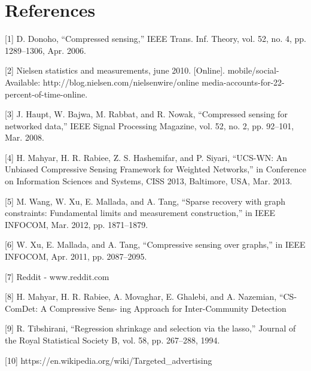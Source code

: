 \documentclass{article}
\begin{document}
\section*{References}
\small

[1] D. Donoho, “Compressed sensing,” IEEE Trans. Inf. Theory, vol. 52,
no. 4, pp. 1289–1306, Apr. 2006.

[2] Nielsen statistics and measurements, june 2010. [Online].
mobile/social-
Available: http://blog.nielsen.com/nielsenwire/online
media-accounts-for-22-percent-of-time-online.

[3] J. Haupt, W. Bajwa, M. Rabbat, and R. Nowak, “Compressed sensing
for networked data,” IEEE Signal Processing Magazine, vol. 52, no. 2,
    pp. 92–101, Mar. 2008.

[4] H. Mahyar, H. R. Rabiee, Z. S. Hashemifar, and P. Siyari, “UCS-WN: An
Unbiased Compressive Sensing Framework for Weighted Networks,” in
Conference on Information Sciences and Systems, CISS 2013, Baltimore,
USA, Mar. 2013.

[5] M. Wang, W. Xu, E. Mallada, and A. Tang, “Sparse recovery with graph
constraints: Fundamental limits and measurement construction,” in IEEE
INFOCOM, Mar. 2012, pp. 1871–1879.

[6] W. Xu, E. Mallada, and A. Tang, “Compressive sensing over graphs,”
in IEEE INFOCOM, Apr. 2011, pp. 2087–2095.

[7] Reddit - www.reddit.com

[8] H. Mahyar, H. R. Rabiee, A. Movaghar, E. Ghalebi,
and A. Nazemian, “CS-ComDet: A Compressive Sens-
ing Approach for Inter-Community Detection

[9] R. Tibshirani, “Regression shrinkage and selection via
the lasso,” Journal of the Royal Statistical Society B,
vol. 58, pp. 267–288, 1994.

[10] https://en.wikipedia.org/wiki/Targeted\_advertising
\end{document}
